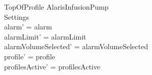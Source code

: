 \begin{schema}{TopOfProfile}
	\Delta AlarisInfusionPump\\
	 Settings\\
	\where
	alarm' = alarm\\
	alarmLimit' = alarmLimit\\
	alarmVolumeSelected' = alarmVolumeSelected\\
	profile' = profile\\
	profilesActive' = profilesActive\\ 
	

\end{schema}
